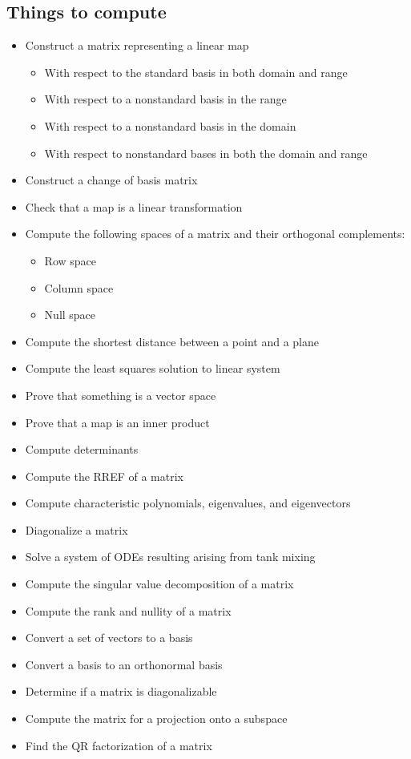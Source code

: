 \hypertarget{things-to-compute}{%
\subsection{Things to compute}\label{things-to-compute}}

\begin{itemize}
\tightlist
\item
  Construct a matrix representing a linear map

  \begin{itemize}
  \tightlist
  \item
    With respect to the standard basis in both domain and range
  \item
    With respect to a nonstandard basis in the range
  \item
    With respect to a nonstandard basis in the domain
  \item
    With respect to nonstandard bases in both the domain and range
  \end{itemize}
\item
  Construct a change of basis matrix
\item
  Check that a map is a linear transformation
\item
  Compute the following spaces of a matrix and their orthogonal
  complements:

  \begin{itemize}
  \tightlist
  \item
    Row space
  \item
    Column space
  \item
    Null space
  \end{itemize}
\item
  Compute the shortest distance between a point and a plane
\item
  Compute the least squares solution to linear system
\item
  Prove that something is a vector space
\item
  Prove that a map is an inner product
\item
  Compute determinants
\item
  Compute the RREF of a matrix
\item
  Compute characteristic polynomials, eigenvalues, and eigenvectors
\item
  Diagonalize a matrix
\item
  Solve a system of ODEs resulting arising from tank mixing
\item
  Compute the singular value decomposition of a matrix
\item
  Compute the rank and nullity of a matrix
\item
  Convert a set of vectors to a basis
\item
  Convert a basis to an orthonormal basis
\item
  Determine if a matrix is diagonalizable
\item
  Compute the matrix for a projection onto a subspace
\item
  Find the QR factorization of a matrix
\end{itemize}

